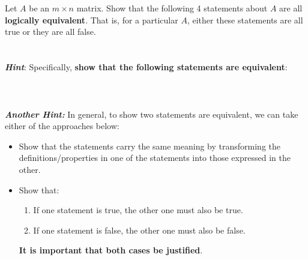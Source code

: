 \\ \\
Let $A$ be an $m \times n$ matrix. Show that the following 4 statements about $A$ are all \textbf{logically equivalent}. That is, for a particular $A$, either these statements are all true or they are all false.
\\
\\ \\
\textbf{\textit{Hint}}: Specifically, \textbf{show that the following statements are equivalent}:
\\ \\
\\ \\
\textbf{\textit{Another Hint:}} In general, to show two statements are equivalent, we can take either of the approaches below:
\begin{itemize}
    \item Show that the statements carry the same meaning by transforming the definitions/properties in one of the statements into those expressed in the other.
    \item Show that:
    \begin{enumerate}
        \item If one statement is true, the other one must also be true.
        \item If one statement is false, the other one must also be false. 
    \end{enumerate}
    \textbf{It is important that both cases be justified}.
\end{itemize}
